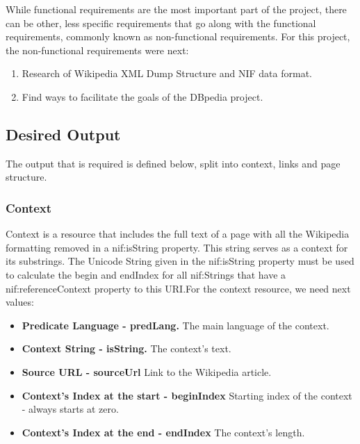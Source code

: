 \documentclass[thesis=M,english,hidelinks]{FITthesis}[2019/12/23]
\begin{document}
While functional requirements are the most important part of the project, there can be other, less specific requirements that go along with the functional requirements, commonly known as non-functional requirements. For this project, the non-functional requirements were next:

\begin{enumerate}
	\item  Research of Wikipedia \gls{XML} Dump Structure and \gls{NIF} data format.
	\item  Find ways to facilitate the goals of the DBpedia project.
\end{enumerate}

\subsection{Desired Output}

The output that is required is defined below\cite{NIF_Format}, split into context, links and page structure. 


\subsubsection{Context}

Context is a resource that includes the full text of a page with all the Wikipedia formatting removed in a nif:isString property. This string serves as a context for its substrings. The Unicode String given in the nif:isString property must be used to calculate the begin and endIndex for all nif:Strings that have a nif:referenceContext property to this URI\cite{NIF_Ontology}.For the context resource, we need next values:

\begin{itemize}
	\item \textbf{Predicate Language - predLang.} The main language of the context. 
	\item \textbf{Context String - isString.} The context's text.
	\item \textbf{Source URL - sourceUrl} Link to the Wikipedia article.
	\item \textbf{Context's Index at the start - beginIndex} Starting index of the context - always starts at zero.
	\item \textbf{Context's Index at the end - endIndex} The context's length.
\end{itemize}
\end{document}
